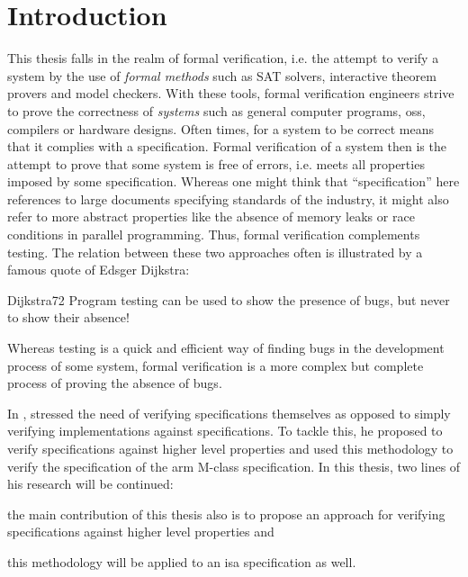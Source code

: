 
\section{Introduction}
\label{sec:introduction}

This thesis falls in the realm of formal verification, i.e. the attempt to verify a system by the use of \textit{formal methods} such as SAT solvers, interactive theorem provers and model checkers.
With these tools, formal verification engineers strive to prove the correctness of \textit{systems} such as general computer programs, \glspl{os}, compilers or hardware designs.
Often times, for a system to be correct means that it complies with a specification.
Formal verification of a system then is the attempt to prove that some system is free of errors, i.e. meets all properties imposed by some specification.
Whereas one might think that \enquote{specification} here references to large documents specifying standards of the industry, it might also refer to more abstract properties like the absence of memory leaks or race conditions in parallel programming.
Thus, formal verification complements testing.
The relation between these two approaches often is illustrated by a famous quote of Edsger Dijkstra:
\begin{displaycquote}[p.6]{Dijkstra72}
    Program testing can be used to show the presence of bugs, but never to show their absence!
\end{displaycquote}

Whereas testing is a quick and efficient way of finding bugs in the development process of some system, formal verification is a more complex but complete process of proving the absence of bugs.

In  \cite{Reid17}, \citeauthor{Reid17} stressed the need of verifying specifications themselves as opposed to simply verifying implementations against specifications.
To tackle this, he proposed to verify specifications against higher level properties and used this methodology to verify the specification of the \gls{arm} M-class specification.
In this thesis, two lines of his research will be continued: \begin{enumerate*}[label=\alph*)]
    \item the main contribution of this thesis also is to propose an approach for verifying specifications against higher level properties and
    \item this methodology will be applied to an \gls{isa} specification as well.
\end{enumerate*}

